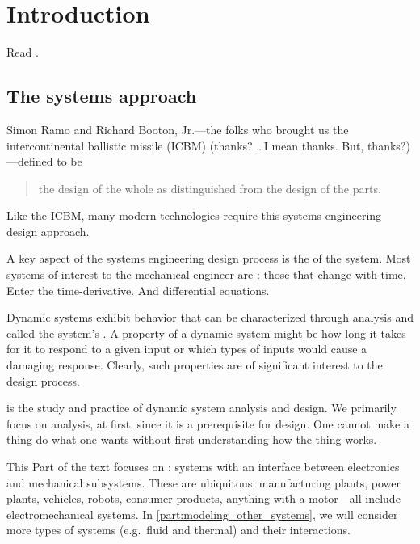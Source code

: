\documentclass[dynamic_systems.tex]{subfiles}
\begin{document}
\chapter{Introduction}
\tags{}
\label{ch:introduction}

Read \cite{Rowell1997}.

\section{The systems approach}
\tags{}

Simon Ramo and Richard Booton, Jr.---the folks who brought us the intercontinental ballistic missile (ICBM) (thanks? \ldots I mean thanks. But, thanks?)---defined  to be
\tags{}

\begin{quote}
  the design of the whole as distinguished from the design of the parts. \citep{Ramo1984}
\end{quote}
Like the ICBM, many modern technologies require this systems engineering design approach.

A key aspect of the systems engineering design process is the  of the system.
Most systems of interest to the mechanical engineer are : those that change with time.
Enter the time-derivative.
And differential equations.
\tags{}

Dynamic systems exhibit behavior that can be characterized through analysis and called the system's .
A property of a dynamic system might be how long it takes for it to respond to a given input or which types of inputs would cause a damaging response.
Clearly, such properties are of significant interest to the design process.
\tags{}

 is the study and practice of dynamic system analysis and design.
We primarily focus on analysis, at first, since it is a prerequisite for design.
One cannot make a thing do what one wants without first understanding how the thing works.
\tags{}

This Part of the text focuses on : systems with an interface between electronics and mechanical subsystems.
These are ubiquitous: manufacturing plants, power plants, vehicles, robots, consumer products, anything with a motor---all include electromechanical systems.
In \cref{part:modeling_other_systems}, we will consider more types of systems (e.g.\ fluid and thermal) and their interactions.
\tags{}
\end{document}
